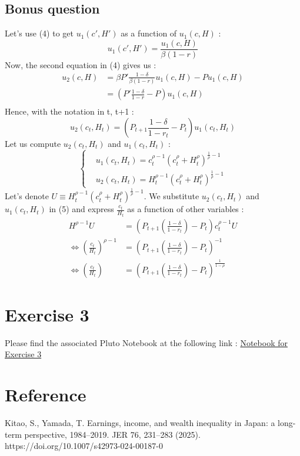 \documentclass{article}
\begin{document}
\subsection{Bonus question}
Let's use (4) to get $u_1(c',H')$ as a function of $u_1(c,H)$ :
$$u_1(c',H') = \frac{u_1(c,H)}{\beta(1-r)}$$
Now, the second equation in (4) gives us : 
$$\begin{aligned}
     u_2(c,H)&= \beta P'\frac{1-\delta}{\beta(1-r)}u_1(c,H) - Pu_1(c,H)\\
     &= (P'\frac{1-\delta}{1-r}-P)u_1(c,H)\\
\end{aligned}$$
Hence, with the notation in t, t+1 : 
\begin{equation}u_2(c_t,H_t) = (P_{t+1}\frac{1-\delta}{1-r_t}-P_t)u_1(c_t,H_t) \end{equation}
Let us compute $u_2(c_t,H_t)$ and $u_1(c_t,H_t)$ : 
$$\left\{\begin{aligned}
    &u_1(c_t,H_t) = c_t^{\rho-1}(c_t^\rho+H_t^\rho)^{\frac{1}{\rho}-1}\\
    &u_2(c_t,H_t) = H_t^{\rho-1}(c_t^\rho+H_t^\rho)^{\frac{1}{\rho}-1}
\end{aligned} \right.$$
Let's denote $U\equiv H_t^{\rho-1}(c_t^\rho+H_t^\rho)^{\frac{1}{\rho}-1}$. We substitute $u_2(c_t,H_t)$ and $u_1(c_t,H_t)$ in (5) and express $\frac{c_t}{H_t}$ as a function of other variables : 
$$\begin{aligned}
    H^{\rho-1}U &= (P_{t+1}(\frac{1-\delta}{1-r_t})-P_t)c_t^{\rho-1}U\\
    \Longleftrightarrow (\frac{c_t}{H_t})^{\rho-1} &= (P_{t+1}(\frac{1-\delta}{1-r_t})-P_t)^{-1}\\
    \Longleftrightarrow (\frac{c_t}{H_t}) &= (P_{t+1}(\frac{1-\delta}{1-r_t})-P_t)^{\frac{1}{1-\rho}}
\end{aligned}$$

\section{Exercise 3}
Please find the associated Pluto Notebook at the following link : \href{https://pluto.land/n/yguc6pup}{Notebook for Exercise 3} 

\section{Reference}
Kitao, S., Yamada, T. Earnings, income, and wealth inequality in Japan: a long-term perspective, 1984–2019. JER 76, 231–283 (2025). https://doi.org/10.1007/s42973-024-00187-0
\end{document}
